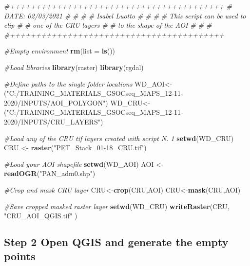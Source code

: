 \documentclass[
  10pt,
  b5paper,
]{book}
\newenvironment{Shaded}{\begin{snugshade}}{\end{snugshade}}
\newcommand{\CommentTok}[1]{\textcolor[rgb]{0.56,0.35,0.01}{\textit{#1}}}
\newcommand{\DataTypeTok}[1]{\textcolor[rgb]{0.13,0.29,0.53}{#1}}
\newcommand{\KeywordTok}[1]{\textcolor[rgb]{0.13,0.29,0.53}{\textbf{#1}}}
\newcommand{\NormalTok}[1]{#1}
\newcommand{\StringTok}[1]{\textcolor[rgb]{0.31,0.60,0.02}{#1}}
\begin{document}
\begin{Shaded}
\begin{Highlighting}[]
\CommentTok{#+++++++++++++++++++++++++++++++++++++++++}
\CommentTok{#  DATE:  02/03/2021                     #}
\CommentTok{#                                        #}
\CommentTok{#  Isabel Luotto                         #}
\CommentTok{#                                        #}
\CommentTok{# This script can be used to clip        #}
\CommentTok{# one of the CRU layers                  #}
\CommentTok{# to the shape of the AOI                #}
\CommentTok{#                                        #}
\CommentTok{#+++++++++++++++++++++++++++++++++++++++++}

\CommentTok{#Empty environment}
\KeywordTok{rm}\NormalTok{(}\DataTypeTok{list =} \KeywordTok{ls}\NormalTok{())}

\CommentTok{#Load libraries}
\KeywordTok{library}\NormalTok{(raster)}
\KeywordTok{library}\NormalTok{(rgdal)}

\CommentTok{#Define paths to the single folder locations}
\NormalTok{WD_AOI<-(}\StringTok{"C:/TRAINING_MATERIALS_GSOCseq_MAPS_12-11-2020/INPUTS/AOI_POLYGON"}\NormalTok{)}
\NormalTok{WD_CRU<-(}\StringTok{"C:/TRAINING_MATERIALS_GSOCseq_MAPS_12-11-2020/INPUTS/CRU_LAYERS"}\NormalTok{)}

\CommentTok{#Load any of the CRU tif layers created with script N. 1}
\KeywordTok{setwd}\NormalTok{(WD_CRU)}
\NormalTok{CRU <-}\StringTok{ }\KeywordTok{raster}\NormalTok{(}\StringTok{"PET_Stack_01-18_CRU.tif"}\NormalTok{)}

\CommentTok{#Load your AOI shapefile}
\KeywordTok{setwd}\NormalTok{(WD_AOI)}
\NormalTok{AOI <-}\StringTok{ }\KeywordTok{readOGR}\NormalTok{(}\StringTok{"PAN_adm0.shp"}\NormalTok{)}

\CommentTok{#Crop and mask CRU layer}
\NormalTok{CRU<-}\KeywordTok{crop}\NormalTok{(CRU,AOI)}
\NormalTok{CRU<-}\KeywordTok{mask}\NormalTok{(CRU,AOI)}

\CommentTok{#Save cropped masked raster layer}
\KeywordTok{setwd}\NormalTok{(WD_CRU)}
\KeywordTok{writeRaster}\NormalTok{(CRU, }\StringTok{"CRU_AOI_QGIS.tif"}\NormalTok{ )}
\end{Highlighting}
\end{Shaded}

\hypertarget{step-2-open-qgis-and-generate-the-empty-points}{%
\subsection{Step 2 Open QGIS and generate the empty points}\label{step-2-open-qgis-and-generate-the-empty-points}}
\end{document}
